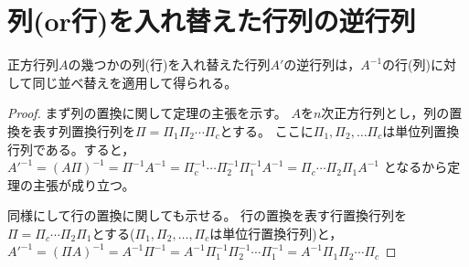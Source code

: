     \section{列(or行)を入れ替えた行列の逆行列}
        \begin{shadebox}
            正方行列$A$の幾つかの列(行)を入れ替えた行列$A'$の逆行列は，$A^{-1}$の行(列)に対して同じ並べ替えを適用して得られる。
        \end{shadebox}
        \begin{proof}
            まず列の置換に関して定理の主張を示す。
            $A$を$n$次正方行列とし，列の置換を表す列置換行列を$\Pi = \Pi_1\Pi_2\dotsm\Pi_c$とする。
            ここに$\Pi_1, \Pi_2, \dotsc\Pi_c$は単位列置換行列である。すると，
            $A'^{-1} = (A\Pi)^{-1} = \Pi^{-1}A^{-1} = \Pi_c^{-1}\dotsm\Pi_2^{-1}\Pi_1^{-1}A^{-1} = \Pi_c\dotsm\Pi_2\Pi_1A^{-1}$
            となるから定理の主張が成り立つ。
            \par
            同様にして行の置換に関しても示せる。
            行の置換を表す行置換行列を$\Pi = \Pi_c\dotsm\Pi_2\Pi_1$とする($\Pi_1, \Pi_2, \dotsc, \Pi_c$は単位行置換行列)と，
            $A'^{-1} = (\Pi A)^{-1} = A^{-1}\Pi^{-1} = A^{-1}\Pi_1^{-1}\Pi_2^{-1}\dotsm\Pi_1^{-1} = A^{-1}\Pi_1\Pi_2\dotsm\Pi_c$
        \end{proof}
